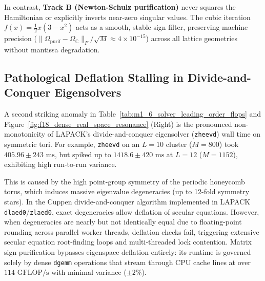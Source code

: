 In contrast, \textbf{Track B (Newton-Schulz purification)} never squares the Hamiltonian or explicitly inverts near-zero singular values. The cubic iteration $f(x) = \frac{1}{2}x(3-x^2)$ acts as a smooth, stable sign filter, preserving machine precision ($\|\Omega_{\mathrm{purif}} - \Omega_{\mathbb{C}}\|_F / \sqrt{M} \approx 4 \times 10^{-15}$) across all lattice geometries without mantissa degradation.

\subsection{Pathological Deflation Stalling in Divide-and-Conquer Eigensolvers}
A second striking anomaly in Table~\ref{tab:m1_6_solver_leading_order_flops} and Figure~\ref{fig:f18_dense_real_space_resonance} (Right) is the pronounced non-monotonicity of LAPACK's divide-and-conquer eigensolver (\texttt{zheevd}) wall time on symmetric tori.
For example, \texttt{zheevd} on an $L=10$ cluster ($M=800$) took $405.96 \pm 243\text{ ms}$, but spiked up to $1418.6 \pm 420\text{ ms}$ at $L=12$ ($M=1152$), exhibiting high run-to-run variance.

This is caused by the high point-group symmetry of the periodic honeycomb torus, which induces massive eigenvalue degeneracies (up to 12-fold symmetry stars).
In the Cuppen divide-and-conquer algorithm implemented in LAPACK \texttt{dlaed0}/\texttt{zlaed0}, exact degeneracies allow deflation of secular equations. However, when degeneracies are nearly but not identically equal due to floating-point rounding across parallel worker threads, deflation checks fail, triggering extensive secular equation root-finding loops and multi-threaded lock contention.
Matrix sign purification bypasses eigenspace deflation entirely: its runtime is governed solely by dense \texttt{dgemm} operations that stream through CPU cache lines at over $114\text{ GFLOP/s}$ with minimal variance ($\pm 2\%$).

